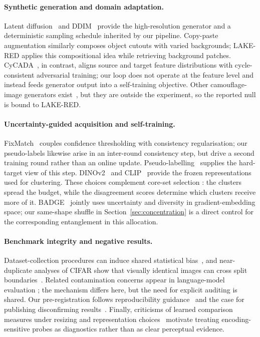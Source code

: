 \documentclass{article}
\begin{document}
\paragraph{Synthetic generation and domain adaptation.}
Latent diffusion~\citep{rombach2022high} and DDIM~\citep{song2021denoising} provide the high-resolution
generator and a deterministic sampling schedule inherited by our pipeline. Copy-paste augmentation
\citep{ghiasi2021simple} similarly composes object cutouts with varied backgrounds; LAKE-RED applies
this compositional idea while retrieving background patches. CyCADA~\citep{hoffman2018cycada}, in
contrast, aligns source and target feature distributions with cycle-consistent adversarial training; our loop does not operate at the feature level and instead feeds generator output into a
self-training objective. Other camouflage-image generators exist~\citep{chen2025realcamo}, but they
are outside the experiment, so the reported null is bound to LAKE-RED.

\paragraph{Uncertainty-guided acquisition and self-training.}
FixMatch~\citep{sohn2020fixmatch} couples confidence thresholding with consistency regularisation; our pseudo-labels likewise arise in an inter-round consistency step, but drive a second training
round rather than an online update. Pseudo-labelling~\citep{lee2013pseudo} supplies the hard-target
view of this step. DINOv2~\citep{oquab2024dinov2} and CLIP~\citep{radford2021learning} provide the
frozen representations used for clustering. These choices complement core-set selection
\citep{sener2018active}: the clusters spread the budget, while the disagreement scores determine
which clusters receive more of it. BADGE~\citep{ash2020deep} jointly uses uncertainty and diversity
in gradient-embedding space; our same-shape shuffle in Section~\ref{sec:concentration} is a direct
control for the corresponding entanglement in this allocation.

\paragraph{Benchmark integrity and negative results.}
Dataset-collection procedures can induce shared statistical bias~\citep{torralba2011unbiased}, and
near-duplicate analyses of CIFAR show that visually identical images can cross split
boundaries~\citep{barz2020train}. Related contamination concerns appear in language-model evaluation
\citep{wu2024antileak}; the mechanism differs here, but the need for explicit auditing is shared.
Our pre-registration follows reproducibility guidance~\citep{pineau2021improving} and the case for
publishing disconfirming results~\citep{karl2024position}. Finally, criticisms of learned comparison
measures under resizing and representation choices~\citep{parmar2022aliased,jayasumana2024rethinking}
motivate treating encoding-sensitive probes as diagnostics rather than as clear perceptual evidence.
\end{document}
